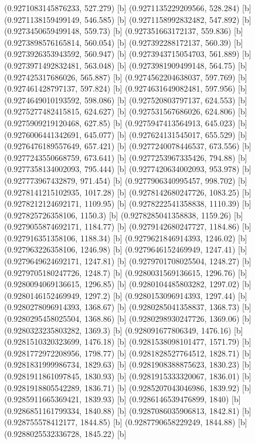 {{{(0.9271083145876233, 527.279) [b] 
(0.9271135229209566, 528.284) [b] 
(0.9271138159499149, 546.585) [b] 
(0.9271158992832482, 547.892) [b] 
(0.9273450659499148, 559.73) [b] 
(0.927351663172137, 559.836) [b] 
(0.9273898576165814, 560.054) [b] 
(0.927392288172137, 560.39) [b] 
(0.9273926353943592, 560.947) [b] 
(0.9273943715054703, 561.889) [b] 
(0.9273971492832481, 563.048) [b] 
(0.9273981909499148, 564.75) [b] 
(0.927425317686026, 565.887) [b] 
(0.9274562204638037, 597.769) [b] 
(0.927461428797137, 597.824) [b] 
(0.9274631649082481, 597.956) [b] 
(0.9274649010193592, 598.086) [b] 
(0.927520803797137, 624.553) [b] 
(0.9275277482415815, 624.627) [b] 
(0.927531567686026, 624.806) [b] 
(0.9275909219120468, 627.85) [b] 
(0.9275947413564913, 645.023) [b] 
(0.9276006441342691, 645.077) [b] 
(0.927624131545017, 655.529) [b] 
(0.9276476189557649, 657.421) [b] 
(0.9277240078446537, 673.556) [b] 
(0.9277243550668759, 673.641) [b] 
(0.9277253967335426, 794.88) [b] 
(0.9277358134002093, 795.444) [b] 
(0.9277420634002093, 953.978) [b] 
(0.927773967432879, 971.454) [b] 
(0.9277906340995457, 998.702) [b] 
(0.9278141215102935, 1017.28) [b] 
(0.9278142680247726, 1083.25) [b] 
(0.9278212124692171, 1109.95) [b] 
(0.9278222541358838, 1110.39) [b] 
(0.927825726358106, 1150.3) [b] 
(0.9278285041358838, 1159.26) [b] 
(0.9279055874692171, 1184.77) [b] 
(0.9279142680247727, 1184.86) [b] 
(0.927916351358106, 1188.34) [b] 
(0.9279621846914393, 1246.02) [b] 
(0.927963226358106, 1246.98) [b] 
(0.9279646152469949, 1247.41) [b] 
(0.9279649624692171, 1247.81) [b] 
(0.9279701708025504, 1248.27) [b] 
(0.9279705180247726, 1248.7) [b] 
(0.9280031569136615, 1296.76) [b] 
(0.9280094069136615, 1296.85) [b] 
(0.9280104485803282, 1297.02) [b] 
(0.9280146152469949, 1297.2) [b] 
(0.9280153096914393, 1297.44) [b] 
(0.9280278096914393, 1368.67) [b] 
(0.9280285041358837, 1368.73) [b] 
(0.9280295458025504, 1368.86) [b] 
(0.9280298930247726, 1369.06) [b] 
(0.9280323235803282, 1369.3) [b] 
(0.928091677806349, 1476.16) [b] 
(0.9281510320323699, 1476.18) [b] 
(0.9281538098101477, 1571.79) [b] 
(0.9281772972208956, 1798.77) [b] 
(0.9281828527764512, 1828.71) [b] 
(0.9281831999986734, 1829.63) [b] 
(0.9281908388875623, 1830.23) [b] 
(0.9281911861097845, 1830.93) [b] 
(0.9281915333320067, 1836.01) [b] 
(0.9281918805542289, 1836.71) [b] 
(0.9285207043046986, 1839.92) [b] 
(0.9285911665369421, 1839.93) [b] 
(0.9286146539476899, 1840) [b] 
(0.9286851161799334, 1840.88) [b] 
(0.9287086035906813, 1842.81) [b] 
(0.928755578412177, 1844.85) [b] 
(0.9287790658229249, 1844.88) [b] 
(0.9288025532336728, 1845.22) [b] 
}}}
